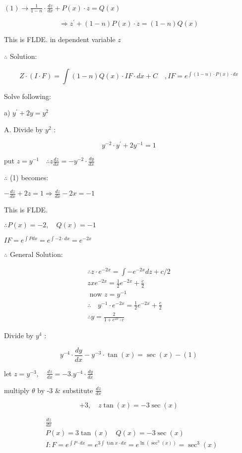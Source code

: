 \documentclass[12pt, a4paper]{article}
\begin{document}
$(1) \rightarrow \frac{1}{1-n} \cdot \frac{d z}{d x}+P(x) \cdot z=Q(x)$

$$
\Rightarrow z^{\prime}+(1-n) P(x) \cdot z=(1-n) Q(x)
$$

This is FLDE. in dependent variable $z$

$\therefore$ Solution:

$$
Z \cdot(I \cdot F)=\int(1-n) Q(x) \cdot I F \cdot d x+C \quad, I F=e^{\int(1-n) \cdot P(x) \cdot d x}
$$

Solve following:

a) $y^{\prime}+2 y=y^{2}$

A. Divide by $y^{2}$ :

$$
y^{-2} \cdot y^{\prime}+2 y^{-1}=1
$$

put $z=y^{-1} \quad \therefore z \frac{d z}{d x}=-y^{-2} \cdot \frac{d y}{d x}$

$\therefore$ (1) becomes:

$-\frac{d z}{d x}+2 z=1 \Rightarrow \frac{d z}{d x}-2 x=-1$

This is FLDE.

$\therefore P(x)=-2, \quad Q(x)=-1$

$I F=e^{\int P d x}=e^{\int-2 \cdot d x}=e^{-2 x}$

$\therefore$ General Solution:

$$
\begin{gathered}
\therefore z \cdot e^{-2 x}=\int-e^{-2 x} d z+c / 2 \\
z x e^{-2 x}=\frac{1}{2} e^{-2 x}+\frac{c}{2} \\
\text { now } z=y^{-1} \\
\therefore \quad y^{-1} \cdot e^{-2 x}=\frac{1}{2} e^{-2 x}+\frac{c}{2} \\
\therefore y=\frac{2}{1+e^{2 x} \cdot c}
\end{gathered}
$$

Divide by $y^{4}$ :

$$
y^{-4} \cdot \frac{d y}{d x}-y^{-3} \cdot \tan (x)=\sec (x)-(1)
$$

let $z=y^{-3}, \quad \frac{d z}{d x}=-3 . y^{-4} \cdot \frac{d y}{d x}$

multiply $\theta$ by -3 \& substitute $\frac{d z}{d x}$

$$
+3, \quad z \tan (x)=-3 \sec (x)
$$

$$
\begin{aligned}
& \frac{d z}{d x} \\
& P(x)=3 \tan (x) \quad Q(x)=-3 \sec (x) \\
& I: F=e^{\int P \cdot d x}=e^{3 \int \tan x \cdot d x}=e^{\ln \left(\sec ^{3}(x)\right)}=\sec ^{3}(x)
\end{aligned}
$$
\end{document}
